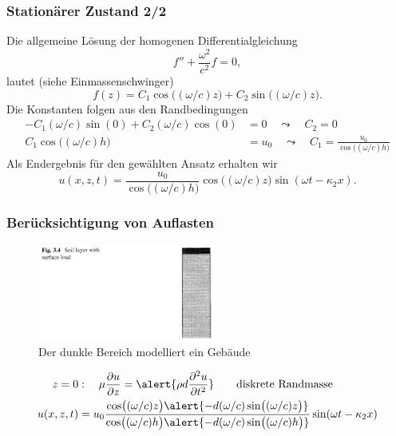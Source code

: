 \documentclass[hyperref={pdfpagemode=FullScreen, colorlinks=false}]{beamer}
\begin{document}
\begin{frame}
\frametitle{Stationärer Zustand 2/2}
Die allgemeine Lösung der homogenen Differentialgleichung
\begin{equation*}
 f''+\frac{\omega^2}{c^2}f=0,
\end{equation*}
lautet (siehe Einmassenschwinger)
\begin{equation*}
 f(z)=C_1\cos\bigl((\omega/c)z\bigr)+C_2\sin\bigl((\omega/c)z\bigr).
\end{equation*}
Die Konstanten folgen aus den Randbedingungen
\begin{align*}
-C_1(\omega/c)\sin(0)+C_2(\omega/c)\cos(0)&=0 \quad \leadsto \quad C_2=0\\
 C_1\cos\bigl((\omega/c)h\bigr)&=u_0
 \quad \leadsto \quad C_1=\frac{u_0}{\cos\bigl((\omega/c)h\bigr)}
\end{align*}
Als Endergebnis für den gewählten Ansatz erhalten wir
\begin{equation*}
 u(x,z,t)=\frac{u_0}{\cos\bigl((\omega/c)h\bigr)}\cos\bigl((\omega/c)z\bigr)\sin(\omega t - \kappa_2 x) .
\end{equation*}
\end{frame}

\begin{frame}
\frametitle{Berücksichtigung von Auflasten}
\begin{figure}
\includegraphics[width=0.525\textwidth]{fig_pdf/earthquake_top_load}
\caption*{Der dunkle Bereich modelliert ein Gebäude \cite{Verruijt2010}}
\end{figure}
\begin{align*}
 z=0 &: \quad \mu\frac{\partial u}{\partial z} = \alert{\rho d \frac{\partial^2 u}{\partial t^2}} \qquad \text{diskrete Randmasse}\\
  u(x,z,t)&=u_0\frac{\cos\bigl((\omega/c)z\bigr)\alert{-d(\omega/c)\sin\bigl((\omega/c)z\bigr)}}{\cos\bigl((\omega/c)h\bigr)\alert{-d(\omega/c)\sin\bigl((\omega/c)h\bigr)}}\sin(\omega t - \kappa_2 x)
\end{align*}
\end{frame}
\end{document}

